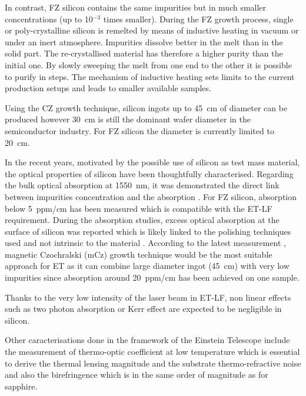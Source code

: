 In contrast, FZ silicon contains the same impurities but in much smaller concentrations (up to 10$^{-3}$ times smaller). During the FZ growth process, single or poly-crystalline silicon is remelted by means of inductive heating in vacuum or under an inert atmosphere. Impurities dissolve better in the melt than in the solid part. The re-crystallised material has therefore a higher purity than the initial one. By slowly sweeping the melt from one end to the other it is possible to purify in steps. The mechanism of inductive heating sets limits to the current production setups and leads to smaller available samples.

Using the CZ growth technique, silicon ingots up to 45~cm of diameter can be produced however 30~cm is still the dominant  wafer diameter in the semiconductor industry. For FZ silicon the diameter is currently limited to 20~cm.

In the recent years, motivated by the possible use of silicon as test mass material, the optical properties of silicon have been thoughtfully characterised. Regarding the bulk optical absorption at 1550~nm, it was demonstrated the direct link between impurities concentration and the absorption \cite{degallaix2013abs_silicon}. For FZ silicon, absorption below 5~ppm/cm has been measured which is compatible with the ET-LF requirement. During the absorption studies, excess optical absorption at the surface of silicon was reported \cite{khalaidovski2013indication} which is likely linked to the polishing techniques used and not intrinsic to the material \cite{bell2017Sisurf}. According to the latest measurement , magnetic Czochralski (mCz) growth technique would be the most suitable approach for ET as it can combine large diameter ingot (45~cm) with very low impurities since absorption around 20~ppm/cm has been achieved on one sample.

Thanks to the very low intensity of the laser beam in ET-LF, non linear effects such as two photon absorption \cite{bristow2007two} or Kerr effect are expected to be negligible in silicon.

Other caracterisations done in the framework of the Einstein Telescope include the measurement of thermo-optic coefficient at low temperature \cite{komma2012SithermoOptic} which is essential to derive the thermal lensing magnitude and the substrate thermo-refractive noise and also the birefringence \cite{kruger2015birefringenceSi} which is in the same order of magnitude as for sapphire. 

